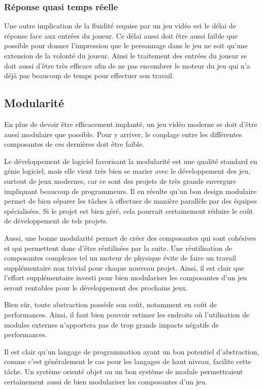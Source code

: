 \documentclass[12pt,oneside,letterpaper,francais]{book}
\begin{document}
\subsubsection{Réponse quasi temps réelle}

Une autre implication de la fluidité requise par un jeu vidéo est le
délai de réponse face aux entrées du joueur. Ce délai aussi doit être
aussi faible que possible pour donner l'impression que le personnage
dans le jeu ne soit qu'une extension de la volonté du joueur. Ainsi le
traitement des entrées du joueur se doit aussi d'être très efficace
afin de ne pas encombrer le moteur du jeu qui n'a déjà pas beaucoup de
temps pour effectuer son travail.

\subsection{Modularité}

En plus de devoir être efficacement implanté, un jeu vidéo moderne se
doit d'être aussi modulaire que possible. Pour y arriver, le couplage
entre les différentes composantes de ces dernières doit être faible. 

Le développement de logiciel favorisant la modularité est une qualité
standard en génie logiciel, mais elle vient très bien se marier avec
le développement des jeu, surtout de jeux modernes, car ce sont des
projets de très grande envergure impliquant beaucoup de
programmeurs. Il en résulte qu'un bon design modulaire permet de bien
séparer les tâches à effectuer de manière parallèle par des équipes
spécialisées. Si le projet est bien géré, cela pourrait certainement
réduire le coût de développement de tels projets.

Aussi, une bonne modularité permet de créer des composantes qui sont
cohésives et qui permettent donc d'être réutilisées par la suite. Une
réutilisation de composantes complexes tel un moteur de physique évite
de faire un travail supplémentaire non trivial pour chaque nouveau
projet. Ainsi, il est clair que l'effort supplémentaire investi pour
bien modulariser les composantes d'un jeu seront rentables pour le
développement des prochains jeux.

Bien sûr, toute abstraction possède son coût, notamment en coût de
performances. Ainsi, il faut bien pouvoir estimer les endroits où
l'utilisation de modules externes n'apportera pas de trop grands
impacts négatifs de performances.

Il est clair qu'un langage de programmation ayant un bon potentiel
d'abstraction, comme c'est généralement le cas pour les langages de
haut niveau, facilite cette tâche. Un système orienté objet ou un bon
système de module permettraient certainement aussi de bien modulariser
les composantes d'un jeu.
\end{document}
